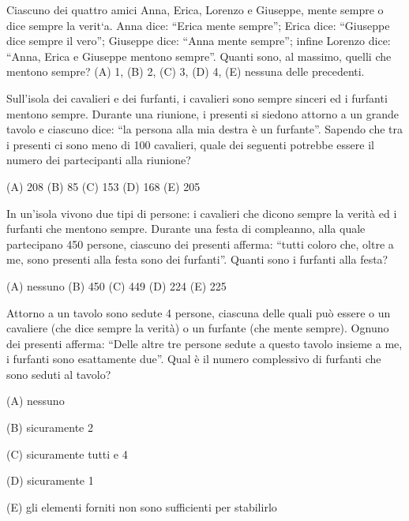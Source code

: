 \begin{esercizio}
    \label{ex:archimede_2011_triennio_15}
    Ciascuno dei quattro amici Anna, Erica, Lorenzo e Giuseppe, mente sempre o dice sempre la verit`{a}.
    Anna dice: “Erica mente sempre”;
    Erica dice: “Giuseppe dice sempre il vero”;
    Giuseppe dice: “Anna mente sempre”;
    infine Lorenzo dice: “Anna, Erica e Giuseppe mentono sempre”.
    Quanti sono, al massimo, quelli che mentono sempre?
    (A) 1, \quad (B) 2, \quad (C) 3, \quad (D) 4, \quad (E) nessuna delle precedenti.
\end{esercizio}

\begin{esercizio}
    \label{ex:archimede_2015_biennio_12}
    Sull'isola dei cavalieri e dei furfanti, i cavalieri sono sempre sinceri ed i furfanti mentono sempre.
    Durante una riunione, i presenti si siedono attorno a un grande tavolo e ciascuno dice:
    “la persona alla mia destra è un furfante”.
    Sapendo che tra i presenti ci sono meno di 100 cavalieri, quale dei seguenti potrebbe essere il numero dei
    partecipanti alla riunione?

    (A) 208 \quad (B) 85 \quad (C) 153 \quad (D) 168 \quad (E) 205
\end{esercizio}

\begin{esercizio}
    \label{ex:archimede_2016_biennio_3}
    In un'isola vivono due tipi di persone: i cavalieri che dicono sempre la verità ed i furfanti che mentono sempre.
    Durante una festa di compleanno, alla quale partecipano 450 persone, ciascuno dei presenti afferma:
    “tutti coloro che, oltre a me, sono presenti alla festa sono dei furfanti”.
    Quanti sono i furfanti alla festa?

    (A) nessuno \quad (B) 450 \quad (C) 449 \quad (D) 224 \quad (E) 225
\end{esercizio}

\begin{esercizio}
    \label{ex:archimede_2017_biennio_2}
    Attorno a un tavolo sono sedute 4 persone, ciascuna delle quali può essere o un cavaliere (che dice sempre la
    verità) o un furfante (che mente sempre).
    Ognuno dei presenti afferma:
    “Delle altre tre persone sedute a questo tavolo insieme a me, i furfanti sono esattamente due”.
    Qual è il numero complessivo di furfanti che sono seduti al tavolo?

    (A) nessuno

    (B) sicuramente 2

    (C) sicuramente tutti e 4

    (D) sicuramente 1

    (E) gli elementi forniti non sono sufficienti per stabilirlo
\end{esercizio}

